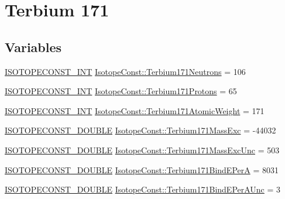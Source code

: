 \hypertarget{group___isotope_const-_terbium-_tb171}{}\section{Terbium 171}
\label{group___isotope_const-_terbium-_tb171}
\subsection*{Variables}
\begin{DoxyCompactItemize}
\item 
\mbox{\hyperlink{group___isotope_const-_macros_ga5f18360b3e99483a35c32d789e62621c}{I\+S\+O\+T\+O\+P\+E\+C\+O\+N\+S\+T\+\_\+\+I\+NT}} \mbox{\hyperlink{group___isotope_const-_terbium-_tb171_ga23551de5e848a8c07e4931f40a9dd895}{Isotope\+Const\+::\+Terbium171\+Neutrons}} = 106
\item 
\mbox{\hyperlink{group___isotope_const-_macros_ga5f18360b3e99483a35c32d789e62621c}{I\+S\+O\+T\+O\+P\+E\+C\+O\+N\+S\+T\+\_\+\+I\+NT}} \mbox{\hyperlink{group___isotope_const-_terbium-_tb171_ga88cc539d724c8198e06b6ed72c91613f}{Isotope\+Const\+::\+Terbium171\+Protons}} = 65
\item 
\mbox{\hyperlink{group___isotope_const-_macros_ga5f18360b3e99483a35c32d789e62621c}{I\+S\+O\+T\+O\+P\+E\+C\+O\+N\+S\+T\+\_\+\+I\+NT}} \mbox{\hyperlink{group___isotope_const-_terbium-_tb171_ga6ca128d327b4c69a801b394de9fca0f5}{Isotope\+Const\+::\+Terbium171\+Atomic\+Weight}} = 171
\item 
\mbox{\hyperlink{group___isotope_const-_macros_ga8f45a7272ce02c0b4c65c44636ed719a}{I\+S\+O\+T\+O\+P\+E\+C\+O\+N\+S\+T\+\_\+\+D\+O\+U\+B\+LE}} \mbox{\hyperlink{group___isotope_const-_terbium-_tb171_gacfc7ffd1c04622ebe53191df4366a847}{Isotope\+Const\+::\+Terbium171\+Mass\+Exc}} = -\/44032
\item 
\mbox{\hyperlink{group___isotope_const-_macros_ga8f45a7272ce02c0b4c65c44636ed719a}{I\+S\+O\+T\+O\+P\+E\+C\+O\+N\+S\+T\+\_\+\+D\+O\+U\+B\+LE}} \mbox{\hyperlink{group___isotope_const-_terbium-_tb171_gace40ead2e0f0d51db65f7831ff913a5a}{Isotope\+Const\+::\+Terbium171\+Mass\+Exc\+Unc}} = 503
\item 
\mbox{\hyperlink{group___isotope_const-_macros_ga8f45a7272ce02c0b4c65c44636ed719a}{I\+S\+O\+T\+O\+P\+E\+C\+O\+N\+S\+T\+\_\+\+D\+O\+U\+B\+LE}} \mbox{\hyperlink{group___isotope_const-_terbium-_tb171_gadccebd628acb765f9267b03e3f60401d}{Isotope\+Const\+::\+Terbium171\+Bind\+E\+PerA}} = 8031
\item 
\mbox{\hyperlink{group___isotope_const-_macros_ga8f45a7272ce02c0b4c65c44636ed719a}{I\+S\+O\+T\+O\+P\+E\+C\+O\+N\+S\+T\+\_\+\+D\+O\+U\+B\+LE}} \mbox{\hyperlink{group___isotope_const-_terbium-_tb171_ga30497df56b755824ada63d40904662d5}{Isotope\+Const\+::\+Terbium171\+Bind\+E\+Per\+A\+Unc}} = 3

\end{DoxyCompactItemize}
